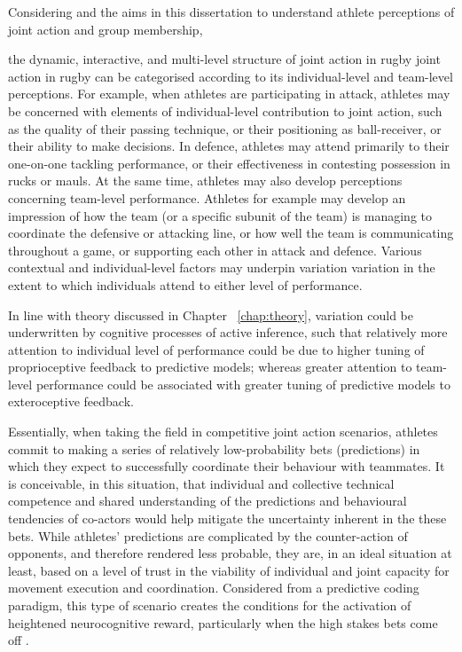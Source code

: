 \begin{CJK}{UTF8}{gbsn}
Considering and the aims in this dissertation to understand athlete perceptions of joint action and group membership,

 the dynamic, interactive, and multi-level structure of joint action in rugby  joint action in rugby can be categorised according to its individual-level and team-level perceptions.  For example, when athletes are participating in attack, athletes may be concerned with elements of individual-level contribution to joint action, such as the quality of their passing technique, or their positioning as ball-receiver, or their ability to make decisions.  In defence, athletes may attend primarily to their one-on-one tackling performance, or their effectiveness in contesting possession in rucks or mauls.  At the same time, athletes may also develop perceptions concerning team-level performance.  Athletes for example may develop an impression of how the team (or a specific subunit of the team) is managing to coordinate the defensive or attacking line, or how well the team is communicating throughout a game, or supporting each other in attack and defence.  Various contextual and individual-level factors may underpin variation variation in the extent to which individuals attend to either level of performance.



In line with theory discussed in Chapter ~\ref{chap:theory}, variation could be underwritten by cognitive processes of active inference, such that relatively more attention to individual level of performance could be due to higher tuning of proprioceptive feedback to predictive models; whereas greater attention to team-level performance could be associated with greater tuning of predictive models to exteroceptive feedback.





Essentially, when taking the field in competitive joint action scenarios, athletes commit to making a series of relatively low-probability bets (predictions) in which they expect to successfully coordinate their behaviour with teammates.  It is conceivable, in this situation, that individual and collective technical competence and shared understanding of the predictions and behavioural tendencies of co-actors would help mitigate the uncertainty inherent in the these bets.  While athletes' predictions are complicated by the counter-action of opponents, and therefore rendered less probable, they are, in an ideal situation at least, based on a level of trust in the viability of individual and joint capacity for movement execution and coordination.  Considered from a predictive coding paradigm, this type of scenario creates the conditions for the activation of heightened neurocognitive reward, particularly when the high stakes bets come off \citep{Chetverikov2016}.



\end{CJK}

